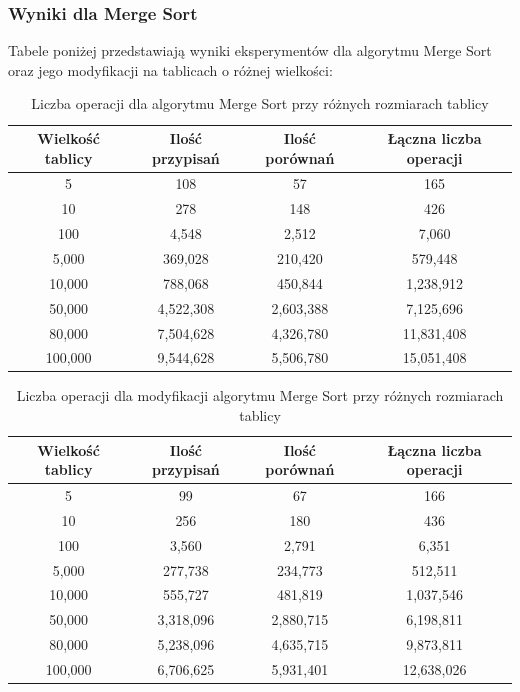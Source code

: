 \documentclass{article}
\begin{document}
\subsubsection{Wyniki dla Merge Sort}
Tabele poniżej przedstawiają wyniki eksperymentów dla algorytmu Merge Sort oraz jego modyfikacji na tablicach o różnej wielkości:
\begin{table}[H]
    \centering
    \begin{tabular}{|c|c|c|c|}
    \hline
    \textbf{Wielkość tablicy} & \textbf{Ilość przypisań} & \textbf{Ilość porównań} & \textbf{Łączna liczba operacji} \\ \hline
    5 & 108 & 57 & 165 \\ \hline
    10 & 278 & 148 & 426 \\ \hline
    100 & 4,548 & 2,512 & 7,060 \\ \hline
    5,000 & 369,028 & 210,420 & 579,448 \\ \hline
    10,000 & 788,068 & 450,844 & 1,238,912 \\ \hline
    50,000 & 4,522,308 & 2,603,388 & 7,125,696 \\ \hline
    80,000 & 7,504,628 & 4,326,780 & 11,831,408 \\ \hline
    100,000 & 9,544,628 & 5,506,780 & 15,051,408 \\ \hline
    \end{tabular}
    \caption{Liczba operacji dla algorytmu Merge Sort przy różnych rozmiarach tablicy}
    \label{tab:merge_results}
\end{table}

\begin{table}[H]
    \centering
    \begin{tabular}{|c|c|c|c|}
    \hline
    \textbf{Wielkość tablicy} & \textbf{Ilość przypisań} & \textbf{Ilość porównań} & \textbf{Łączna liczba operacji} \\ \hline
    5 & 99 & 67 & 166 \\ \hline
    10 & 256 & 180 & 436 \\ \hline
    100 & 3,560 & 2,791 & 6,351 \\ \hline
    5,000 & 277,738 & 234,773 & 512,511 \\ \hline
    10,000 & 555,727 & 481,819 & 1,037,546 \\ \hline
    50,000 & 3,318,096 & 2,880,715 & 6,198,811 \\ \hline
    80,000 & 5,238,096 & 4,635,715 & 9,873,811 \\ \hline
    100,000 & 6,706,625 & 5,931,401 & 12,638,026 \\ \hline
    \end{tabular}
    \caption{Liczba operacji dla modyfikacji algorytmu Merge Sort przy różnych rozmiarach tablicy}
    \label{tab:m_merge_results}
\end{table}
\end{document}
